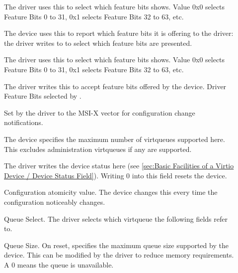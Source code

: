 \begin{description}
\item[]
        The driver uses this to select which feature bits  shows.
        Value 0x0 selects Feature Bits 0 to 31, 0x1 selects Feature Bits 32 to 63, etc.

\item[]
        The device uses this to report which feature bits it is
        offering to the driver: the driver writes to
         to select which feature bits are presented.

\item[]
        The driver uses this to select which feature bits  shows.
        Value 0x0 selects Feature Bits 0 to 31, 0x1 selects Feature Bits 32 to 63, etc.

\item[]
        The driver writes this to accept feature bits offered by the device.
        Driver Feature Bits selected by .

\item[]
        Set by the driver to the MSI-X vector for configuration change notifications.

\item[]
        The device specifies the maximum number of virtqueues supported here.
        This excludes administration virtqueues if any are supported.

\item[]
        The driver writes the device status here (see \ref{sec:Basic Facilities of a Virtio Device / Device Status Field}). Writing 0 into this
        field resets the device.

\item[]
        Configuration atomicity value.  The device changes this every time the
        configuration noticeably changes.

\item[]
        Queue Select. The driver selects which virtqueue the following
        fields refer to.

\item[]
        Queue Size.  On reset, specifies the maximum queue size supported by
        the device. This can be modified by the driver to reduce memory requirements.
        A 0 means the queue is unavailable.


\end{description}
